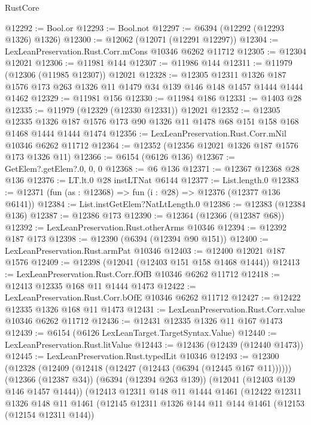 \begin{lexlean}{RustCore}
\begin{coremodule}
@12292 := Bool.or
@12293 := Bool.not
@12297 := @6394 (@12292 (@12293 @1326) @1326)
@12300 := @12062 (@12071 (@12291 @12297))
@12304 := LexLeanPreservation.Rust.Corr.mCons @10346 @6262 @11712
@12305 := @12304 @12021
@12306 := @11981 @144
@12307 := @11986 @144
@12311 := @11979 (@12306 (@11985 @12307)) @12021
@12328 := @12305
    @12311
    @1326
    @187
    @1576
    @173
    @263
    @1326
    @11
    @1479
    @34
    @139
    @146
    @148
    @1457
    @1444
    @1444
    @1462
@12329 := @11981 @156
@12330 := @11984 @186
@12331 := @1403 @28
@12335 := @11979 (@12329 (@12330 @12331)) @12021
@12352 := @12305
    @12335
    @1326
    @187
    @1576
    @173
    @90
    @1326
    @11
    @1478
    @68
    @151
    @158
    @168
    @1468
    @1444
    @1444
    @1474
@12356 := LexLeanPreservation.Rust.Corr.mNil @10346 @6262 @11712
@12364 := @12352 (@12356 @12021 @1326 @187 @1576 @173 @1326 @11)
@12366 := @6154 (@6126 @136)
@12367 := GetElem?.getElem?.{0, 0, 0}
@12368 := @6 @136
@12371 := @12367 @12368 @28 @136
@12376 := LT.lt.{0} @28 instLTNat @6144
@12377 := List.length.{0}
@12383 := @12371 (fun (as : @12368) => fun (i : @28) => @12376 (@12377 @136 @6141))
@12384 := List.instGetElem?NatLtLength.{0}
@12386 := @12383 (@12384 @136)
@12387 := @12386 @173
@12390 := @12364 (@12366 (@12387 @68))
@12392 := LexLeanPreservation.Rust.otherArms @10346
@12394 := @12392 @187 @173
@12398 := @12390 (@6394 (@12394 @90 @151))
@12400 := LexLeanPreservation.Rust.armPat @10346
@12403 := @12400 @12021 @187 @1576
@12409 := @12398 (@12041 (@12403 @151 @158 @1468 @1444))
@12413 := LexLeanPreservation.Rust.Corr.fOfB @10346 @6262 @11712
@12418 := @12413 @12335 @168 @11 @1444 @1473
@12422 := LexLeanPreservation.Rust.Corr.bOfE @10346 @6262 @11712
@12427 := @12422 @12335 @1326 @168 @11 @1473
@12431 := LexLeanPreservation.Rust.Corr.value @10346 @6262 @11712
@12436 := @12431 @12335 @1326 @11 @167 @1473
@12439 := @6154 (@6126 LexLeanTarget.TargetSyntax.Value)
@12440 := LexLeanPreservation.Rust.litValue
@12443 := @12436 (@12439 (@12440 @1473))
@12445 := LexLeanPreservation.Rust.typedLit @10346
@12493 := @12300
    (@12328
      (@12409 (@12418 (@12427 (@12443 (@6394 (@12445 @167 @11))))))
      (@12366 (@12387 @34))
      (@6394 (@12394 @263 @139))
      (@12041 (@12403 @139 @146 @1457 @1444))
      (@12413
        @12311
        @148
        @11
        @1444
        @1461
        (@12422
          @12311
          @1326
          @148
          @11
          @1461
          (@12145
            @12311
            @1326
            @144
            @11
            @144
            @1461
            (@12153 (@12154 @12311 @144))

\end{coremodule}
\end{lexlean}
